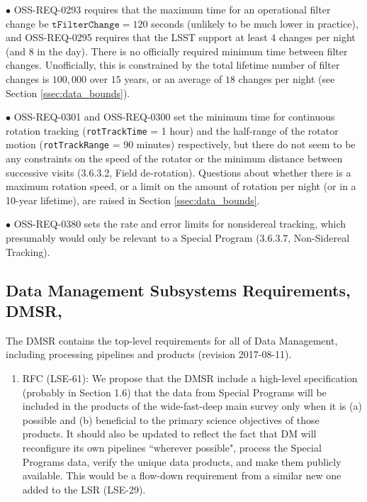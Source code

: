\documentclass[DM,lsstdraft,toc]{lsstdoc}
\begin{document}
$\bullet$ OSS-REQ-0293 requires that the maximum time for an operational filter change be $\texttt{tFilterChange} = 120$ seconds (unlikely to be much lower in practice), and OSS-REQ-0295 requires that the LSST support at least 4 changes per night (and 8 in the day). There is no officially required minimum time between filter changes. Unofficially, this is constrained by the total lifetime number of filter changes is $100,000$ over $15$ years, or an average of $18$ changes per night (see Section \ref{ssec:data_bounds}).

$\bullet$ OSS-REQ-0301 and OSS-REQ-0300 set the minimum time for continuous rotation tracking (\texttt{rotTrackTime} = 1 hour) and the half-range of the rotator motion (\texttt{rotTrackRange} = 90 minutes) respectively, but there do not seem to be any constraints on the speed of the rotator or the minimum distance between successive visits (3.6.3.2, Field de-rotation). Questions about whether there is a maximum rotation speed, or a limit on the amount of rotation per night (or in a 10-year lifetime), are raised in Section \ref{ssec:data_bounds}.

$\bullet$ OSS-REQ-0380 sets the rate and error limits for nonsidereal tracking, which presumably would only be relevant to a Special Program (3.6.3.7, Non-Sidereal Tracking).


\subsection{Data Management Subsystems Requirements, DMSR, }\label{ssec:docrev_dmsr}

The DMSR contains the top-level requirements for all of Data Management, including processing pipelines and products (revision 2017-08-11).

\begin{enumerate}[resume,topsep=-10pt,after=\vspace{10pt},label= \textbf{Action \Roman*}] \item \label{DMSR-0} RFC (LSE-61): We propose that the DMSR include a high-level specification (probably in Section 1.6) that the data from Special Programs will be included in the products of the wide-fast-deep main survey only when it is (a) possible and (b) beneficial to the primary science objectives of those products. It should also be updated to reflect the fact that DM will reconfigure its own pipelines ``wherever possible", process the Special Programs data, verify the unique data products, and make them publicly available. This would be a flow-down requirement from a similar new one added to the LSR (LSE-29).  \end{enumerate}
\end{document}
